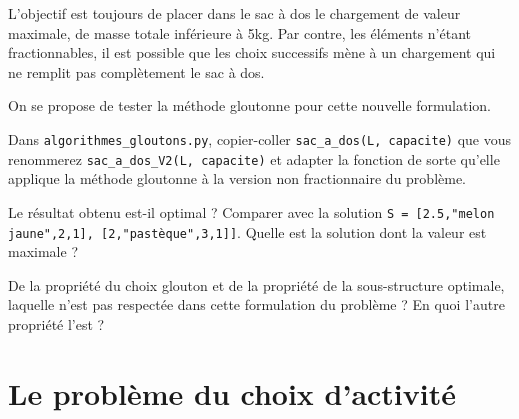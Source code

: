 L’objectif est toujours de placer dans le sac à dos le chargement de valeur maximale, de masse totale inférieure à 5kg. Par contre, les éléments n’étant fractionnables, il est possible que les choix successifs mène à un chargement qui ne remplit pas complètement le sac à dos.

On se propose de tester la méthode gloutonne pour cette nouvelle formulation. 

 

\begin{question}
Dans \lstinline{algorithmes_gloutons.py}, copier-coller \lstinline{sac_a_dos(L, capacite)} que vous renommerez \lstinline{sac_a_dos_V2(L, capacite)} et adapter la fonction de sorte qu’elle applique la méthode gloutonne à la version non fractionnaire du problème. %


\end{question}

\begin{question}
Le résultat obtenu est-il optimal ? Comparer avec la solution \lstinline{S = [2.5,"melon jaune",2,1], [2,"pastèque",3,1]]}. Quelle est la solution dont la valeur est maximale ?
\end{question}

\begin{question}
De la propriété du choix glouton et de la propriété de la sous-structure optimale, laquelle n’est pas respectée dans cette formulation du problème ? En quoi l’autre propriété l’est ?
\end{question}

 


\section*{Le problème du choix d'activité}
